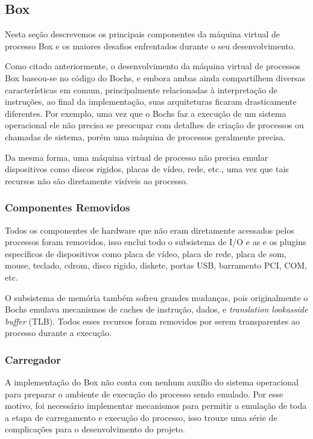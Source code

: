 \documentclass[11pt,twoside]{article}
\begin{document}
\subsection{Box}

Nesta seção descrevemos os principais componentes da máquina virtual de processo
Box e os maiores desafios enfrentados durante o seu desenvolvimento.

Como citado anteriormente, o desenvolvimento da máquina virtual de processos Box
baseou-se no código do Bochs, e embora ambas ainda compartilhem diversas
características em comum, principalmente relacionadas à interpretação de
instruções, ao final da implementação, suas arquiteturas ficaram drasticamente
diferentes. Por exemplo, uma vez que o Bochs faz a execução de um sistema
operacional ele não precisa se preocupar com detalhes de criação de processos ou
chamadas de sistema, porém uma máquina de processos geralmente precisa. 

Da mesma forma, uma máquina virtual de processo não precisa emular dispositivos
como discos rigidos, placas de vídeo, rede, etc., uma vez que tais recursos não
são diretamente visíveis ao processo.

\subsubsection{Componentes Removidos}

Todos os componentes de hardware que não eram diretamente acessados pelos
processos foram removidos, isso enclui todo o subsistema de I/O e as e os
plugins específicos de dispositivos como placa de vídeo, placa de rede, placa de
som, mouse, teclado, cdrom, disco rigido, diskete, portas USB, barramento PCI,
COM, etc.

O subsistema de memória também sofreu grandes mudanças, pois originalmente o
Bochs emulava mecanismos de caches de instrução, dados, e \emph{translation
lookasside buffer} (TLB). Todos esses recursos foram removidos por serem
transparentes ao processo durante a execução.

\subsubsection{Carregador}

A implementação do Box não conta con nenhum auxílio do sistema operacional para
preparar o ambiente de execução do processo sendo emulado. Por esse motivo, foi
necessário implementar mecanismos para permitir a emulação de toda a etapa de
carregamento e execução do processo, isso trouxe uma série de complicações para
o desenvolvimento do projeto.
\end{document}
